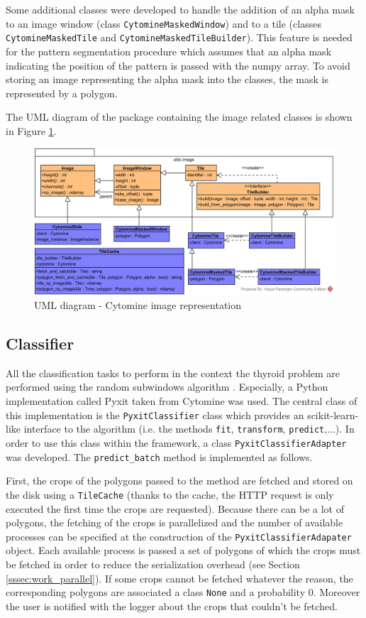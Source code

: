 Some additional classes were developed to handle the addition of an alpha mask to an image window (class \texttt{CytomineMaskedWindow}) and to a tile (classes \texttt{CytomineMaskedTile} and \texttt{CytomineMaskedTileBuilder}). This feature is needed for the pattern segmentation procedure which assumes that an alpha mask indicating the position of the pattern is passed with the numpy array. To avoid storing an image representing the alpha mask into the classes, the mask is represented by a polygon. 

The UML diagram of the package containing the image related classes is shown in Figure \ref{fig:uml_cyto_im_repr}.

\begin{figure}
	\center
	\includegraphics[scale=0.85]{image/thyroid_image.png}
	\caption{UML diagram - Cytomine image representation}
	\label{fig:uml_cyto_im_repr}
\end{figure}

\subsection{Classifier}

All the classification tasks to perform in the context the thyroid problem are performed using the random subwindows algorithm \cite{Maree201617}. Especially, a Python implementation called Pyxit taken from Cytomine \cite{maree2016collaborative} was used. The central class of this implementation is the \texttt{PyxitClassifier} class which provides an scikit-learn-like interface to the algorithm (i.e. the methods \texttt{fit}, \texttt{transform}, \texttt{predict},...). In order to use this class within the framework, a class \texttt{PyxitClassifierAdapter} was developed. The \texttt{predict\_batch} method is implemented as follows.

 First, the crops of the polygons passed to the method are fetched and stored on the disk using a \texttt{TileCache} (thanks to the cache, the HTTP request is only executed the first time the crops are requested). Because there can be a lot of polygons, the fetching of the crops is parallelized and the number of available processes can be specified at the construction of the \texttt{PyxitClassifierAdapater} object. Each available process is passed a set of polygons of which the crops must be fetched in order to reduce the serialization overhead (see Section \ref{sssec:work_parallel}). If some crops cannot be fetched whatever the reason, the corresponding polygons are associated a class \texttt{None} and a probability 0. Moreover the user is notified with the logger about the crops that couldn't be fetched.

